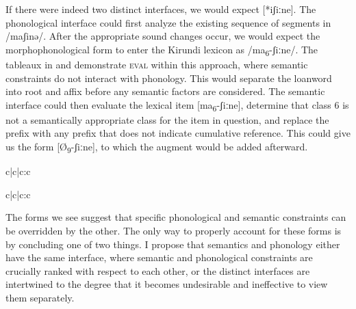 \documentclass[output=paper,colorlinks,citecolor=brown,
]{langscibook}
\begin{document}
If there were indeed two distinct interfaces, we would expect [*iʃiːne]. The phonological interface could first analyze the existing sequence of segments in /maʃin{ə}/. After the appropriate sound changes occur, we would expect the morphophonological form to enter the Kirundi lexicon as /ma\textsubscript{6}-ʃiːne/. The tableaux in  and  demonstrate \textsc{eval} within this approach, where semantic constraints do not interact with phonology. This would separate the loanword into root and affix before any semantic factors are considered. The semantic interface could then evaluate the lexical item [ma\textsubscript{6}-ʃiːne], determine that class 6 is not a semantically appropriate class for the item in question, and replace the prefix with any prefix that does not indicate cumulative reference. This could give us the form [Ø\textsubscript{9}-ʃiːne], to which the augment would be added afterward. 

\begin{table}
\ShadingOn
  \caption{Phonology Eval}
  \label{tab:kinchsular:phonologyeval}
\begin{tableau}{c|c|c:c} 
    
 \vio{} \vio{} \vio{*!} \vio{} 
 \vio{} \vio{} \vio{} \vio{} 
\end{tableau}
\end{table}

\begin{table}
\ShadingOn
  \caption{Semantic Eval}
  \label{tab:kinchsular:semanticeval}
\begin{tableau}{c|c|c:c} 
   
 \vio{} \vio{} 
 \vio{} \vio{*!} 
 \vio{*!} \vio{} 
\end{tableau}
\end{table}

The forms we see suggest that specific phonological and semantic constraints can be overridden by the other. The only way to properly account for these forms is by concluding one of two things. I propose that semantics and phonology either have the same interface, where semantic and phonological constraints are crucially ranked with respect to each other, or the distinct interfaces are intertwined to the degree that it becomes undesirable and ineffective to view them separately.
\end{document}
